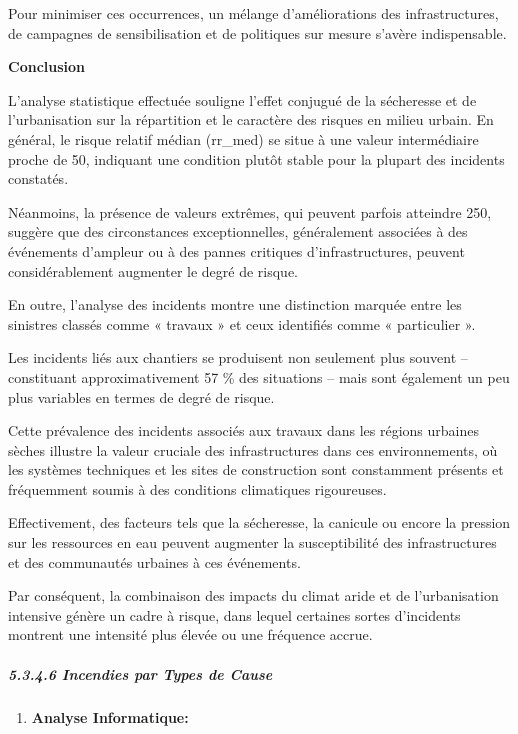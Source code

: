 \documentclass[
]{article}
\providecommand{\tightlist}{%
  \setlength{\itemsep}{0pt}\setlength{\parskip}{0pt}}
\begin{document}
Pour minimiser ces occurrences, un mélange d'améliorations des
infrastructures, de campagnes de sensibilisation et de politiques sur
mesure s'avère indispensable.

\textbf{Conclusion}

L'analyse statistique effectuée souligne l'effet conjugué de la
sécheresse et de l'urbanisation sur la répartition et le caractère des
risques en milieu urbain. En général, le risque relatif médian (rr\_med)
se situe à une valeur intermédiaire proche de 50, indiquant une
condition plutôt stable pour la plupart des incidents constatés.

Néanmoins, la présence de valeurs extrêmes, qui peuvent parfois
atteindre 250, suggère que des circonstances exceptionnelles,
généralement associées à des événements d'ampleur ou à des pannes
critiques d'infrastructures, peuvent considérablement augmenter le degré
de risque.

En outre, l'analyse des incidents montre une distinction marquée entre
les sinistres classés comme « travaux » et ceux identifiés comme «
particulier ».

Les incidents liés aux chantiers se produisent non seulement plus
souvent -- constituant approximativement 57 \% des situations -- mais
sont également un peu plus variables en termes de degré de risque.

Cette prévalence des incidents associés aux travaux dans les régions
urbaines sèches illustre la valeur cruciale des infrastructures dans ces
environnements, où les systèmes techniques et les sites de construction
sont constamment présents et fréquemment soumis à des conditions
climatiques rigoureuses.

Effectivement, des facteurs tels que la sécheresse, la canicule ou
encore la pression sur les ressources en eau peuvent augmenter la
susceptibilité des infrastructures et des communautés urbaines à ces
événements.

Par conséquent, la combinaison des impacts du climat aride et de
l'urbanisation intensive génère un cadre à risque, dans lequel certaines
sortes d'incidents montrent une intensité plus élevée ou une fréquence
accrue.

\subparagraph{5.3.4.6 Incendies par Types de
Cause}\label{incendies-par-types-de-cause}

\begin{enumerate}
\def\labelenumi{\arabic{enumi}.}
\tightlist
\item
  \textbf{Analyse Informatique:}
\end{enumerate}
\end{document}
